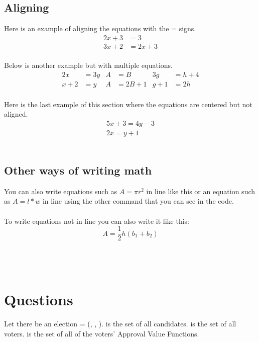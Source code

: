 \documentclass{article}
\begin{document}
\subsection{Aligning}

Here is an example of aligning the equations with the = signs.
\begin{align*} 
2x+3&=3\\
3x+2&=2x+3
\end{align*}\\

Below is another example but with multiple equations.
\begin{align*}
2x&=3y  &   A&=B    &   3g&=h+4 \\
x+2&=y  &   A&=2B+1 &   g+1&=2h
\end{align*}\\

Here is the last example of this section where the equations are centered but not aligned.
\begin{gather*} 
5x+3=4y-3 \\
2x=y+1 
\end{gather*}\\


\subsection{Other ways of writing math}
You can also write equations such as \(A=\pi r^2\) in line like this or an equation such as $A=l*w$ in line using the other command that you can see in the code.\\\\

To write equations not in line you can also write it like this: \[A=\frac{1}{2}h(b_1+b_2)\]\\\\\\

\section{Questions}

Let there be an election  = (, , ).
 is the set of all candidates.
 is the set of all voters.
 is the set of all of the voters' Approval Value Functions.\\
\end{document}
